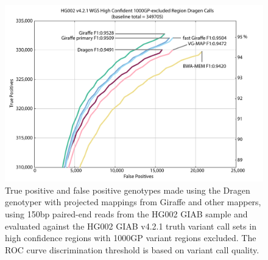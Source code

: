 \documentclass[11pt]{ucscthesis}
\begin{document}
\begin{figure}[H]
    \centering
    \includegraphics[width=\linewidth]{HG002_v4.2.1_high_conf.35x_150bp.wgs.vcfevalroc.1000GP_excluded.pdf}
    \caption[Genotyping evaluation for the Dragen genotyper with projected mappings from Giraffe and other mappers in 1000GP excluded regions]{True positive and false positive genotypes made using the Dragen genotyper with projected mappings from Giraffe and other mappers, using 150bp paired-end reads from the HG002 GIAB sample and evaluated against the HG002 GIAB v4.2.1 truth variant call sets in high confidence regions with 1000GP variant regions excluded. The ROC curve discrimination threshold is based on variant call quality.}
    \label{fig:150bp_genotyping_1000GP_excluded}
\end{figure}
\end{document}
